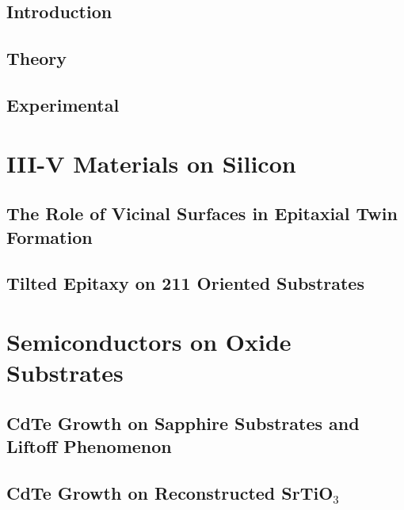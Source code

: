 \documentclass[letterpaper,10pt,twoside]{report}
\begin{document}
	\pagestyle{fancy}
	\fancyhead{}
	\fancyfoot{}
	\fancyfoot[CE,CO]{\thepage}



\chapter{Introduction}

\chapter{Theory}

\chapter{Experimental}

\part{III-V Materials on Silicon}
\chapter{The Role of Vicinal Surfaces in Epitaxial Twin Formation}

\chapter{Tilted Epitaxy on 211 Oriented Substrates}

\part{Semiconductors on Oxide Substrates}
\chapter{CdTe Growth on Sapphire Substrates and Liftoff Phenomenon}

\chapter{CdTe Growth on Reconstructed \texorpdfstring{SrTiO$_3$}{SrTiO3}}

\end{document}
